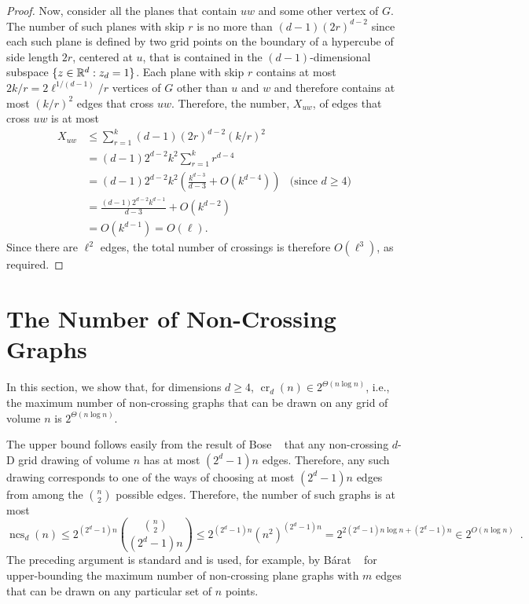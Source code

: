 \documentclass{patmorin}
\DeclareMathOperator{\crs}{cr}
\DeclareMathOperator{\ncs}{ncs}
\begin{document}
\begin{proof}
Now, consider all the planes that contain $uw$ and some other vertex
of $G$.  The number of such planes with skip $r$ is no more than
$(d-1)(2r)^{d-2}$ since each such plane is defined by two grid points on
the boundary of a hypercube of side length $2r$, centered at $u$, that
is contained in the $(d-1)$-dimensional subspace $\{z\in\mathbb{R}^d:z_d=1\}$.
Each plane with skip $r$ contains at most $2k/r=2\ell^{1/(d-1)}/r$
vertices of $G$ other than $u$ and $w$ and therefore contains at most
$(k/r)^2$ edges that cross $uw$.  Therefore, the number, $X_{uw}$,
of edges that cross $uw$ is at most
\begin{align*}
   X_{uw} & \le \sum_{r=1}^k(d-1)(2r)^{d-2}(k/r)^2 \\
       & = (d-1)2^{d-2}k^2\sum_{r=1}^k r^{d-4} \\
       & = (d-1)2^{d-2}k^2\left(\frac{k^{d-3}}{d-3} + O\left(k^{d-4}\right)\right) & \text{(since $d\ge 4$)} \\
       & = \frac{(d-1)2^{d-2}k^{d-1}}{d-3} + O(k^{d-2}) \\
       & = O(k^{d-1}) = O(\ell).
\end{align*}
Since there are $\ell^2$ edges, the total number of crossings is therefore
$O(\ell^3)$, as required.
\end{proof}

\section{The Number of Non-Crossing Graphs}

In this section, we show that, for dimensions $d\ge 4$, $\crs_d(n)\in
2^{\Theta(n\log n)}$, i.e., the maximum number of non-crossing graphs
that can be drawn on any grid of volume $n$ is $2^{\Theta(n\log n)}$.

The upper bound follows easily from the result of Bose
\etal~\cite{bose.czyzowicz.ea:maximum} that any non-crossing $d$-D grid
drawing of volume $n$ has at most $(2^d-1)n$ edges.  Therefore, any such
drawing corresponds to one of the ways of choosing at most $(2^d-1)n$
edges from among the $\binom{n}{2}$ possible edges.  Therefore, the
number of such graphs is at most
\[
    \ncs_d(n) \le 2^{(2^d-1)n}\binom{\binom{n}{2}}{(2^d-1)n} \le 2^{(2^d-1)n} (n^{2})^{(2^d-1)n} = 2^{2(2^d-1)n\log n+(2^d-1)n} \in 2^{O(n\log n)} \enspace .
\]
The preceding argument is standard and is used, for example, by B\'arat
\etal~\cite[Lemma~4]{barat.matousek.ea:bounded-degree} for upper-bounding
the maximum number of non-crossing plane graphs with $m$ edges that can
be drawn on any particular set of $n$ points.
\end{document}
